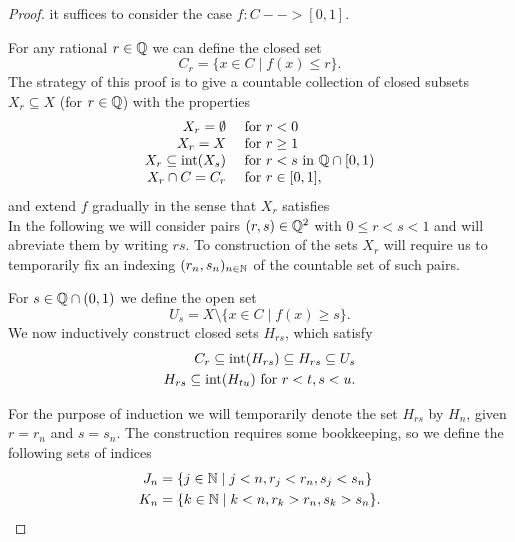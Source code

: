 \begin{proof}

	 it suffices to consider the case $f:C --> [0,1]$.

	For any rational $r \in \mathbb{Q}$ we can define the closed set
	\begin{equation*}
		C_r = \{x \in C \mid f(x) \leq r\}.
	\end{equation*}
	The strategy of this proof is to give a countable collection of closed subsets $X_r \subseteq X$ (for $r \in \mathbb{Q}$) with the properties
	\begin{equation}\label{TietzeUrysohnEq1}
		\begin{array}{rl}
			X_r = \emptyset & \text{ for } r < 0\\
			X_r = X & \text{ for } r \geq 1\\
			X_r \subseteq \operatorname{int}(X_s) & \text{ for }r<s \text{ in } \mathbb{Q} \cap [0,1)\\
			X_r \cap C = C_r & \text{ for } r \in [0,1],
		\end{array}
	\end{equation}
	and extend $f$ gradually in the sense that $X_r$ satisfies \\

	In the following we will consider pairs $(r,s) \in \mathbb{Q}^2$ with $0 \leq r < s < 1$ and will abreviate them by writing $rs$. To construction of the sets $X_r$ will require us to temporarily fix an indexing $(r_n,s_n)_{n \in \mathbb{N}}$ of the countable set of such pairs.

	For $s \in \mathbb{Q} \cap (0,1)$ we define the open set
	\begin{equation*}
		U_s = X \setminus \{x \in C \mid f(x) \geq s\}.
	\end{equation*}
	We now inductively construct closed sets $H_{rs}$, which satisfy
	\begin{align*}
		C_r \subseteq \operatorname{int}(H_{rs}) \subseteq H_{rs} \subseteq U_s\\
		H_{rs} \subseteq \operatorname{int}(H_{tu}) \text{ for }r<t,s<u.
	\end{align*}

	For the purpose of induction we will temporarily denote the set $H_{rs}$ by $H_n$, given $r=r_n$ and $s=s_n$. The construction requires  some bookkeeping, so we define the following sets of indices
	\begin{align*}
		J_n &= \{j \in \mathbb{N} \mid j < n, r_j < r_n, s_j < s_n\}\\
		K_n &= \{k \in \mathbb{N} \mid k < n, r_k > r_n, s_k > s_n\}.
	\end{align*}


\end{proof}
